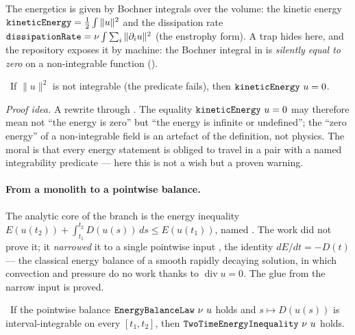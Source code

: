 The energetics is given by Bochner integrals over the volume: the kinetic energy
$\texttt{kineticEnergy} = \tfrac12\int\|u\|^2$ and the dissipation rate
$\texttt{dissipationRate} = \nu\int\sum_i\|\partial_i u\|^2$ (the enstrophy form). A trap hides here,
and the repository exposes it by machine: the Bochner integral in  is
\emph{silently equal to zero} on a non-integrable function ().

\begin{theorem}\label{thm:kineticEnergy_of_not_integrable}
\green{}\ If $\|u\|^2$ is not integrable (the predicate  fails), then
$\texttt{kineticEnergy}\ u = 0$. 
\end{theorem}

\emph{Proof idea.} A rewrite through . The equality
$\texttt{kineticEnergy}\ u = 0$ may therefore mean not ``the energy is zero'' but ``the energy is
infinite or undefined''; the ``zero energy'' of a non-integrable field is an artefact of the
definition, not physics. The moral is that every energy statement is obliged to travel in a pair
with a named integrability predicate --- here this is not a wish but a proven warning.

\paragraph{From a monolith to a pointwise balance.}
The analytic core of the branch is the energy inequality
$E(u(t_2)) + \int_{t_1}^{t_2} D(u(s))\,ds \le E(u(t_1))$, named . The
work did not prove it; it \emph{narrowed} it to a single pointwise input ,
the  identity $dE/dt = -D(t)$ --- the classical energy balance of a smooth rapidly
decaying solution, in which convection and pressure do no work thanks to $\operatorname{div} u = 0$.
The glue from the narrow input is proved.

\begin{theorem}\label{thm:twoTimeEnergyInequality_of_energyBalance}
\green{}\ If the pointwise balance $\code{EnergyBalanceLaw}\ \nu\ u$ holds and $s \mapsto D(u(s))$ is
interval-integrable on every $[t_1,t_2]$, then $\code{TwoTimeEnergyInequality}\ \nu\ u$ holds.
\end{theorem}

